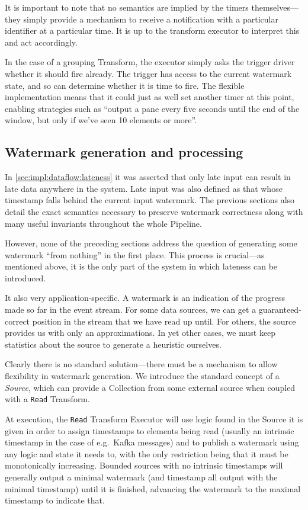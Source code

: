 It is important to note that no semantics are implied by the timers themselves---they simply provide a mechanism to receive a notification with a particular identifier at a particular time.
It is up to the transform executor to interpret this and act accordingly.

In the case of a grouping Transform, the executor simply asks the trigger driver whether it should fire already.
The trigger has access to the current watermark state, and so can determine whether it is time to fire.
The flexible implementation means that it could just as well set another timer at this point, enabling strategies such as ``output a pane every five seconds until the end of the window, but only if we've seen 10 elements or more''.

\subsection{Watermark generation and processing}\label{sec:impl:dataflow:watermark-generation}


In \cref{sec:impl:dataflow:lateness} it was asserted that only late input can result in late data anywhere in the system.
Late input was also defined as that whose timestamp falls behind the current input watermark.
The previous sections also detail the exact semantics necessary to preserve watermark correctness along with many useful invariants throughout the whole Pipeline.

However, none of the preceding sections address the question of generating some watermark ``from nothing'' in the first place.
This process is crucial---as mentioned above, it is the only part of the system in which lateness can be introduced.

It also very application-specific.
A watermark is an indication of the progress made so far in the event stream.
For some data sources, we can get a guaranteed-correct position in the stream that we have read up until.
For others, the source provides us with only an approximations.
In yet other cases, we must keep statistics about the source to generate a heuristic ourselves.

Clearly there is no standard solution---there must be a mechanism to allow flexibility in watermark generation.
We introduce the standard concept of a \emph{Source}, which can provide a Collection from some external source when coupled with a \verb|Read| Transform.

At execution, the \verb|Read| Transform Executor will use logic found in the Source it is given in order to assign timestamps to elements being read (usually an intrinsic timestamp in the case of e.g.\ Kafka messages) and to publish a watermark using any logic and state it needs to, with the only restriction being that it must be monotonically increasing.
Bounded sources with no intrinsic timestamps will generally output a minimal watermark (and timestamp all output with the minimal timestamp) until it is finished, advancing the watermark to the maximal timestamp to indicate that.

